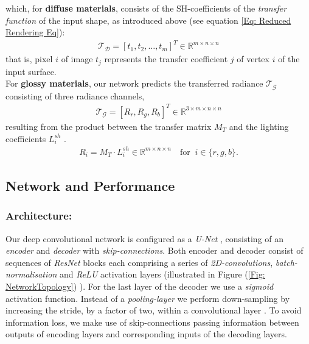 which, for \textbf{diffuse materials}, consists of the SH-coefficients of the \textit{transfer function} of the input shape, as introduced above (see equation \ref{Eq: Reduced Rendering Eq}):
\begin{align*}
	\mathcal{T_D} = [ t_1, t_2, \dots, t_m ]^T \in \mathbb{R}^{m \times n \times n} 
\end{align*}
that is, pixel $i$ of image $t_j$ represents the transfer coefficient $j$ of vertex $i$ of the input surface.
\\
For \textbf{glossy materials}, our network predicts the transferred radiance $\mathcal{T_G}$ consisting of three radiance channels, 
\begin{align*}
\mathcal{T_G} = [R_r , R_g ,R_b]^T \in \mathbb{R}^{3 \times m \times n \times n} 
\end{align*}
resulting from the product between the transfer matrix $M_T$ and the lighting coefficients  $ L^{sh}_i$ \cite{sloan2002precomputed}. 
\begin{align*}
R_i= M_T \cdot L^{sh}_i   \in \mathbb{R}^{m \times n \times n}   \quad \text{for }~  i \in \{r,g,b\} .
\end{align*}

\subsection{Network and Performance }
\subsubsection*{Architecture: \\} 
Our deep convolutional network is configured as a \textit{U-Net}  \cite{U-Net}, consisting of an \textit{encoder} and \textit{decoder} with \textit{skip-connections}. Both encoder and decoder consist of sequences of \textit{ResNet} blocks \cite{ResNet} each comprising a series of \textit{2D-convolutions}, \textit{batch-normalisation} and \textit{ReLU} activation layers (illustrated in Figure (\ref{Fig: NetworkTopology}) ). For the last layer of the decoder we use a \textit{sigmoid} activation function. Instead of a \textit{pooling-layer} we perform down-sampling by increasing the stride, by a factor of two, within a convolutional layer \cite{StridingConv}. To avoid information loss,  we make use of skip-connections passing information between outputs of encoding layers and corresponding inputs of the decoding layers.

